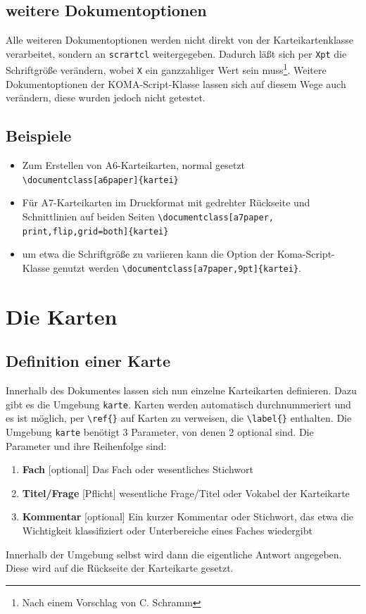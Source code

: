 \documentclass[a4paper,DIV=calc]{scrartcl}
\newcommand{\befehl}[1]{%
\marginpar{\footnotesize\textsf{#1}}%
}
\begin{document}
\subsection{weitere Dokumentoptionen}
Alle weiteren Dokumentoptionen werden nicht direkt von der Karteikartenklasse verarbeitet, sondern an \lstinline!scrartcl! weitergegeben. Dadurch läßt sich per \befehl{Xpt}\lstinline!Xpt! die Schriftgröße verändern, wobei \lstinline!X! ein ganzzahliger Wert sein muss\footnote{Nach einem Vorschlag von C. Schramm}. Weitere Dokumentoptionen der KOMA-Script-Klasse lassen sich auf diesem Wege auch verändern, diese wurden jedoch nicht getestet.

\subsection{Beispiele}
\begin{itemize}
	\item Zum Erstellen von A6-Karteikarten, normal gesetzt \lstinline!\documentclass[a6paper]{kartei}!
	\item Für A7-Karteikarten im Druckformat mit gedrehter Rückseite und Schnittlinien auf beiden Seiten \lstinline!\documentclass[a7paper, print,flip,grid=both]{kartei}!
	\item um etwa die Schriftgröße zu variieren kann die Option der Koma-Script-Klasse genutzt werden \lstinline!\documentclass[a7paper,9pt]{kartei}!.
\end{itemize}
%
%
%
\section{Die Karten}

\subsection{Definition einer Karte}\label{def:Karte}\befehl{\textbackslash begin\{karte\}}

Innerhalb des Dokumentes lassen sich nun einzelne Karteikarten definieren. Dazu gibt es die Umgebung \lstinline!karte!. Karten werden automatisch durchnummeriert und es ist möglich, per \lstinline!\ref{}! auf Karten zu verweisen, die \lstinline!\label{}! enthalten.
Die Umgebung \lstinline!karte! benötigt 3 Parameter, von denen 2 optional sind. Die Parameter und ihre Reihenfolge sind:
\begin{enumerate}[1.]
	\item \textbf{Fach} [optional] Das Fach oder wesentliches Stichwort
	\item \textbf{Titel/Frage} [Pflicht] wesentliche Frage/Titel oder Vokabel der Karteikarte
	\item \textbf{Kommentar} [optional] Ein kurzer Kommentar oder Stichwort, das etwa die Wichtigkeit klassifiziert oder Unterbereiche eines Faches wiedergibt
\end{enumerate}
Innerhalb der Umgebung selbst wird dann die eigentliche Antwort angegeben. Diese wird auf die Rückseite der Karteikarte gesetzt.
\end{document}
